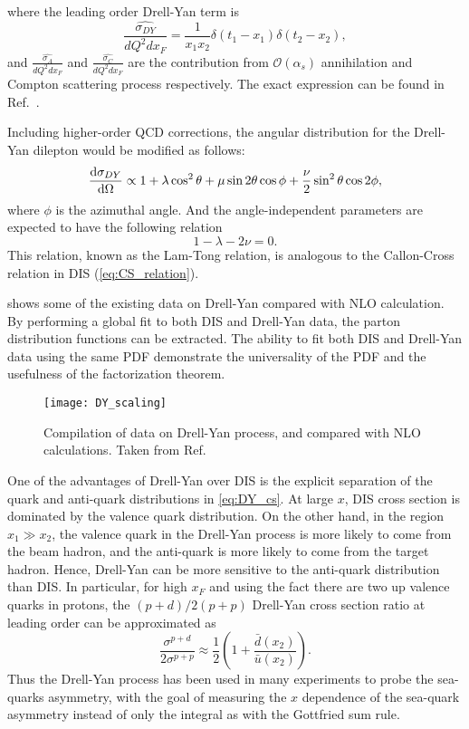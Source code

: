 \documentclass[../main.tex]{subfiles}
\begin{document}
where the leading order Drell-Yan term is
\begin{equation}
	\frac{\hat{\sigma_{DY}}}{dQ^2dx_F} = \frac{1}{x_1 x_2} \delta(t_1 - x_1)\delta(t_2 - x_2),
\end{equation}
and $\frac{\hat{\sigma_{A}}}{dQ^2dx_F}$ and $\frac{\hat{\sigma_{C}}}{dQ^2dx_F}$
are the contribution from $\mathcal{O}(\alpha_s)$ annihilation and Compton scattering process respectively.
The exact expression can be found in Ref.~\cite{sutton1992}.

Including higher-order QCD corrections, the angular distribution for the Drell-Yan dilepton would
be modified as follows:
\begin{equation}
	\dv{\sigma_{DY}}{\Omega} \propto 1 + \lambda \cos^2\theta + \mu \sin 2\theta\cos\phi +\frac{\nu}{2}\sin^2\theta\cos 2\phi,
\end{equation}
where $\phi$ is the azimuthal angle. And the angle-independent parameters are expected to have the
following relation \cite{lam1980}
\begin{equation}
	1-\lambda-2\nu=0.
\end{equation}
This relation, known as the Lam-Tong relation, is analogous to the Callon-Cross relation in DIS
(\cref{eq:CS_relation}).

 shows some of the existing data on Drell-Yan compared with NLO calculation. By
performing a global fit to both DIS and Drell-Yan data, the parton distribution
functions can be extracted. The ability to fit both DIS and Drell-Yan data using
the same PDF demonstrate the universality of the PDF and the usefulness of the
factorization theorem.
\begin{figure}[htbp!]
	\centering
	\texttt{[image: DY\_scaling]}
	\caption{Compilation of data on Drell-Yan process, and compared with NLO calculations.
		Taken from Ref.~\cite{mcgaughey1999}}
	\label{fig:DY_scaling}
\end{figure}

One of the advantages of Drell-Yan over DIS is the explicit separation of the quark
and anti-quark distributions in \cref{eq:DY_cs}. At large $x$, DIS cross section
is dominated by the valence quark distribution. On the other hand, in the region $x_1 \gg x_2$,
the valence quark in the Drell-Yan process is more likely to come from the beam
hadron, and the anti-quark is more likely to come from the target hadron. Hence,
Drell-Yan can be more sensitive to the anti-quark distribution than DIS. In
particular, for high $x_F$ and using the fact there are two up valence quarks in
protons, the $(p+d)/2(p+p)$ Drell-Yan cross section ratio at leading order
can be approximated as
\begin{equation}
	\frac{\sigma^{p+d}}{2\sigma^{p+p}} \approx \frac{1}{2} \left( 1+ \frac{\bar{d}\left(x_2\right)}{\bar{u}\left(x_2\right)} \right).
\end{equation}
Thus the Drell-Yan process has been used in many experiments to probe the sea-quarks
asymmetry, with the goal of measuring the $x$ dependence of the sea-quark asymmetry
instead of only the integral as with the Gottfried sum rule.
\end{document}
